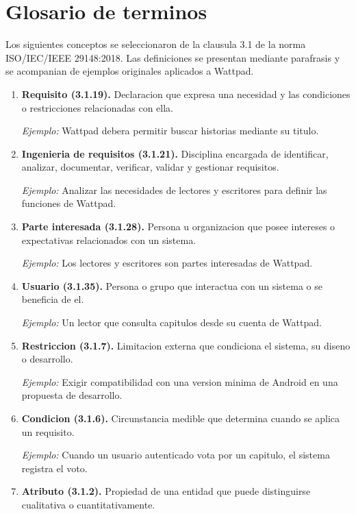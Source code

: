 \documentclass[11pt,a4paper]{article}
\begin{document}
\section{Glosario de terminos}

Los siguientes conceptos se seleccionaron
de la clausula 3.1 de la norma
ISO/IEC/IEEE 29148:2018.
Las definiciones se presentan mediante
parafrasis y se acompanian de ejemplos
originales aplicados a Wattpad.

\begin{enumerate}

\item \textbf{Requisito (3.1.19).}
Declaracion que expresa una necesidad
y las condiciones o restricciones
relacionadas con ella.

\textit{Ejemplo:} Wattpad debera permitir
buscar historias mediante su titulo.

\item \textbf{Ingenieria de requisitos (3.1.21).}
Disciplina encargada de identificar,
analizar, documentar, verificar,
validar y gestionar requisitos.

\textit{Ejemplo:} Analizar las necesidades
de lectores y escritores para definir
las funciones de Wattpad.

\item \textbf{Parte interesada (3.1.28).}
Persona u organizacion que posee
intereses o expectativas relacionados
con un sistema.

\textit{Ejemplo:} Los lectores y escritores
son partes interesadas de Wattpad.

\item \textbf{Usuario (3.1.35).}
Persona o grupo que interactua
con un sistema o se beneficia de el.

\textit{Ejemplo:} Un lector que consulta
capitulos desde su cuenta de Wattpad.

\item \textbf{Restriccion (3.1.7).}
Limitacion externa que condiciona
el sistema, su diseno o desarrollo.

\textit{Ejemplo:} Exigir compatibilidad
con una version minima de Android
en una propuesta de desarrollo.

\item \textbf{Condicion (3.1.6).}
Circunstancia medible que determina
cuando se aplica un requisito.

\textit{Ejemplo:} Cuando un usuario
autenticado vota por un capitulo,
el sistema registra el voto.

\item \textbf{Atributo (3.1.2).}
Propiedad de una entidad que puede
distinguirse cualitativa o
cuantitativamente.


\end{enumerate}
\end{document}
